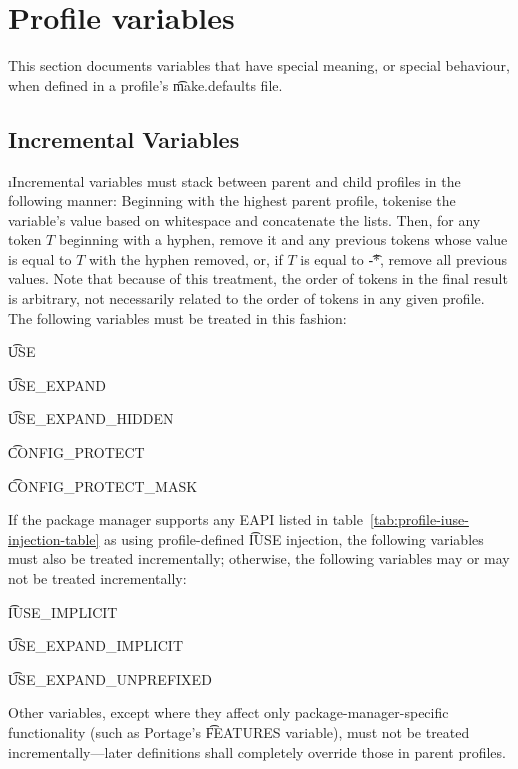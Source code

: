 \section{Profile variables}
\label{sec:profile-variables}

This section documents variables that have special meaning, or special behaviour, when defined in a
profile's \t{make.defaults} file.

\subsection{Incremental Variables}
\i{Incremental} variables must stack between parent and child profiles in the following manner:
Beginning with the highest parent profile, tokenise the variable's value based on whitespace and
concatenate the lists. Then, for any token $T$ beginning with a hyphen, remove it and any previous
tokens whose value is equal to $T$ with the hyphen removed, or, if $T$ is equal to \t{-*}, remove
all previous values. Note that because of this treatment, the order of tokens in the final result is
arbitrary, not necessarily related to the order of tokens in any given profile. The following
variables must be treated in this fashion:
\begin{compactitem}
\item \t{USE}
\item \t{USE\_EXPAND}
\item \t{USE\_EXPAND\_HIDDEN}
\item \t{CONFIG\_PROTECT}
\item \t{CONFIG\_PROTECT\_MASK}
\end{compactitem}

If the package manager supports any EAPI listed in table~\ref{tab:profile-iuse-injection-table} as
using profile-defined \t{IUSE} injection, the following variables must also be treated
incrementally; otherwise, the following variables may or may not be treated incrementally:
\begin{compactitem}
\item \t{IUSE\_IMPLICIT}
\item \t{USE\_EXPAND\_IMPLICIT}
\item \t{USE\_EXPAND\_UNPREFIXED}
\end{compactitem}

Other variables, except where they affect only package-manager-specific functionality (such as
Portage's \t{FEATURES} variable), must not be treated incrementally---later definitions shall
completely override those in parent profiles.

